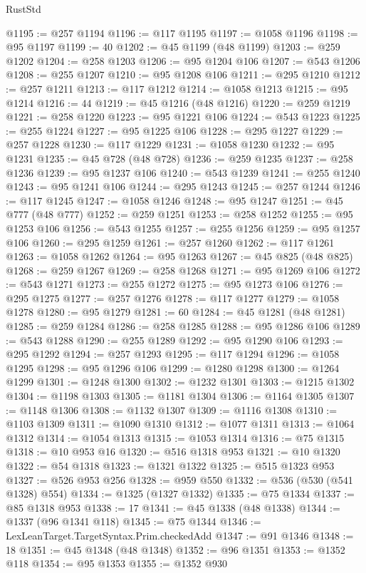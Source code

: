 \begin{lexlean}{RustStd}
\begin{coremodule}
{\begin{coremodule}
{{{{{{{{{{{{{{{{{{{{{{{{{{{{{{{{{{{{{{{@1195 := @257 @1194
@1196 := @117 @1195
@1197 := @1058 @1196
@1198 := @95 @1197
@1199 := 40
@1202 := @45 @1199 (@48 @1199)
@1203 := @259 @1202
@1204 := @258 @1203
@1206 := @95 @1204 @106
@1207 := @543 @1206
@1208 := @255 @1207
@1210 := @95 @1208 @106
@1211 := @295 @1210
@1212 := @257 @1211
@1213 := @117 @1212
@1214 := @1058 @1213
@1215 := @95 @1214
@1216 := 44
@1219 := @45 @1216 (@48 @1216)
@1220 := @259 @1219
@1221 := @258 @1220
@1223 := @95 @1221 @106
@1224 := @543 @1223
@1225 := @255 @1224
@1227 := @95 @1225 @106
@1228 := @295 @1227
@1229 := @257 @1228
@1230 := @117 @1229
@1231 := @1058 @1230
@1232 := @95 @1231
@1235 := @45 @728 (@48 @728)
@1236 := @259 @1235
@1237 := @258 @1236
@1239 := @95 @1237 @106
@1240 := @543 @1239
@1241 := @255 @1240
@1243 := @95 @1241 @106
@1244 := @295 @1243
@1245 := @257 @1244
@1246 := @117 @1245
@1247 := @1058 @1246
@1248 := @95 @1247
@1251 := @45 @777 (@48 @777)
@1252 := @259 @1251
@1253 := @258 @1252
@1255 := @95 @1253 @106
@1256 := @543 @1255
@1257 := @255 @1256
@1259 := @95 @1257 @106
@1260 := @295 @1259
@1261 := @257 @1260
@1262 := @117 @1261
@1263 := @1058 @1262
@1264 := @95 @1263
@1267 := @45 @825 (@48 @825)
@1268 := @259 @1267
@1269 := @258 @1268
@1271 := @95 @1269 @106
@1272 := @543 @1271
@1273 := @255 @1272
@1275 := @95 @1273 @106
@1276 := @295 @1275
@1277 := @257 @1276
@1278 := @117 @1277
@1279 := @1058 @1278
@1280 := @95 @1279
@1281 := 60
@1284 := @45 @1281 (@48 @1281)
@1285 := @259 @1284
@1286 := @258 @1285
@1288 := @95 @1286 @106
@1289 := @543 @1288
@1290 := @255 @1289
@1292 := @95 @1290 @106
@1293 := @295 @1292
@1294 := @257 @1293
@1295 := @117 @1294
@1296 := @1058 @1295
@1298 := @95 @1296 @106
@1299 := @1280 @1298
@1300 := @1264 @1299
@1301 := @1248 @1300
@1302 := @1232 @1301
@1303 := @1215 @1302
@1304 := @1198 @1303
@1305 := @1181 @1304
@1306 := @1164 @1305
@1307 := @1148 @1306
@1308 := @1132 @1307
@1309 := @1116 @1308
@1310 := @1103 @1309
@1311 := @1090 @1310
@1312 := @1077 @1311
@1313 := @1064 @1312
@1314 := @1054 @1313
@1315 := @1053 @1314
@1316 := @75 @1315
@1318 := @10 @953 @16
@1320 := @516 @1318 @953
@1321 := @10 @1320
@1322 := @54 @1318
@1323 := @1321 @1322
@1325 := @515 @1323 @953
@1327 := @526 @953 @256
@1328 := @959 @550
@1332 := @536 (@530 (@541 @1328) @554)
@1334 := @1325 (@1327 @1332)
@1335 := @75 @1334
@1337 := @85 @1318 @953
@1338 := 17
@1341 := @45 @1338 (@48 @1338)
@1344 := @1337 (@96 @1341 @118)
@1345 := @75 @1344
@1346 := LexLeanTarget.TargetSyntax.Prim.checkedAdd
@1347 := @91 @1346
@1348 := 18
@1351 := @45 @1348 (@48 @1348)
@1352 := @96 @1351
@1353 := @1352 @118
@1354 := @95 @1353
@1355 := @1352 @930
}}}}}}}}}}}}}}}}}}}}}}}}}}}}}}}}}}}}}}}
\end{coremodule}}
\end{coremodule}
\end{lexlean}
